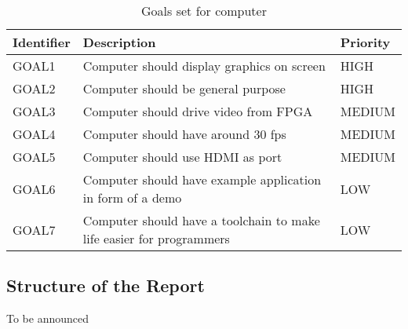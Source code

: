\begin{table}[h]
    \centering
    \begin{tabular}{|l|l|l|}
        \hline
        \textbf{Identifier}           & \textbf{Description}                & \textbf{Priority} \\ \hline
        GOAL1  & Computer should display graphics on screen                           & HIGH    \\ \hline
        GOAL2  & Computer should be general purpose                                   & HIGH    \\ \hline
        GOAL3  & Computer should drive video from FPGA                                & MEDIUM  \\ \hline
        GOAL4  & Computer should have around 30 fps                                   & MEDIUM  \\ \hline
        GOAL5  & Computer should use HDMI as port                                     & MEDIUM  \\ \hline
        GOAL6  & Computer should have example application in form of a demo           & LOW     \\ \hline
        GOAL7  & Computer should have a toolchain to make life easier for programmers & LOW     \\ \hline
    \end{tabular}
    \caption{Goals set for computer}
    \label{tab:goals}
\end{table}

\subsection{Structure of the Report}

To be announced
